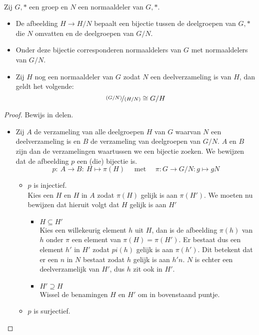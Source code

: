 \documentclass[main.tex]{subfiles}
\begin{document}
\begin{st}
  \\
  Zij $G,*$ een groep en $N$ een normaaldeler van $G,*$.
  \begin{itemize}
  \item De afbeelding $H \rightarrow H/N$ bepaalt een bijectie tussen de deelgroepen van $G,*$ die $N$ omvatten en de deelgroepen van $G/N$.
  \item Onder deze bijectie corresponderen normaaldelers van $G$ met normaaldelers van $G/N$.
  \item Zij $H$ nog een normaaldeler van $G$ zodat $N$ een deelverzameling is van $H$, dan geldt het volgende:
    \[ \nicefrac{(G/N)}{(H/N)} \cong G/H\]
  \end{itemize}

  \begin{proof}
    Bewijs in delen.
    \begin{itemize}
    \item
      Zij $A$ de verzameling van alle deelgroepen $H$ van $G$ waarvan $N$ een deelverzameling is en $B$ de verzameling van deelgroepen van $G/N$.
      $A$ en $B$ zijn dan de verzamelingen waartussen we een bijectie zoeken.
      We bewijzen dat de afbeelding $p$ een (die) bijectie is.
      \[ p:\ A \rightarrow B:\ H \mapsto \pi(H) \quad\text{ met }\quad \pi: G \rightarrow G/N: g \mapsto gN \]
      \begin{itemize}
      \item $p$ is injectief.\\
        Kies een $H$ en $H$ in $A$ zodat $\pi(H)$ gelijk is aan $\pi(H')$.
        We moeten nu bewijzen dat hieruit volgt dat $H$ gelijk is aan $H'$
        \begin{itemize}
        \item $H \subseteq H'$\\
          Kies een willekeurig element $h$ uit $H$, dan is de afbeelding $\pi(h)$ van $h$ onder $\pi$ een element van $\pi(H) = \pi(H')$.
          Er bestaat dus een element $h'$ in $H'$ zodat $pi(h)$ gelijk is aan $\pi(h')$.
          Dit betekent dat er een $n$ in $N$ bestaat zodat $h$ gelijk is aan $h'n$.
          $N$ is echter een deelverzamelijk van $H'$, dus $h$ zit ook in $H'$.
        \item $H' \supseteq H$\\
          Wissel de benamingen $H$ en $H'$ om in bovenstaand puntje.
        \end{itemize}
      \item $p$ is surjectief.\\

\end{itemize}
\end{itemize}
\end{proof}
\end{st}
\end{document}
